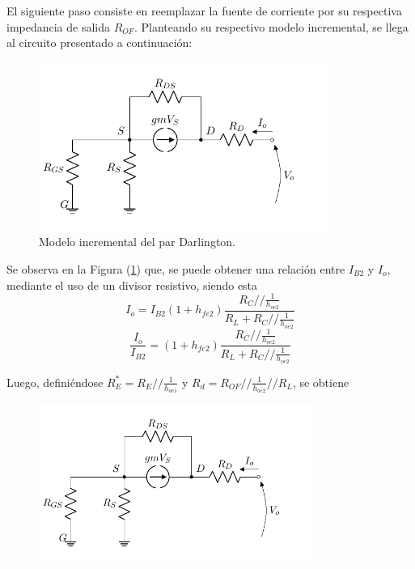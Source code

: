 El siguiente paso consiste en reemplazar la fuente de corriente por su respectiva impedancia de salida $R_{OF}$. Planteando su respectivo modelo incremental, se llega al circuito presentado a continuación: 
\begin{figure}[H]
\centering
	\includegraphics[width=0.85\textwidth, page=3]{Imagenes/ModeloIncremental.pdf}
	\caption{Modelo incremental del par Darlington.}
\label{fig:incdar}
\end{figure}

Se observa en la Figura (\ref{fig:incdar}) que, se puede obtener una relación entre $I_{B2}$ y $I_o$, mediante el uso de un divisor resistivo, siendo esta
\begin{equation*}
	I_o = I_{B2} \left( 1 + h_{fe2} \right) \frac{R_C // \frac{1}{h_{oe2}}}{R_L + R_C // \frac{1}{h_{oe2}}}
\end{equation*}
\begin{equation}
	\frac{I_o}{I_{B2}} = \left( 1 + h_{fe2} \right) \frac{R_C // \frac{1}{h_{oe2}}}{R_L + R_C // \frac{1}{h_{oe2}}}
	\label{equ:io-ib2}
\end{equation}

Luego, definiéndose $R_{E}^* = R_{E} // \frac{1}{h_{oe1}}$ y $R_d = R_{OF} // \frac{1}{h_{oe2}} // R_L$, se obtiene
\begin{figure}[H]
\centering
	\includegraphics[width=0.8\textwidth, page=4]{Imagenes/ModeloIncremental.pdf}
\end{figure}

